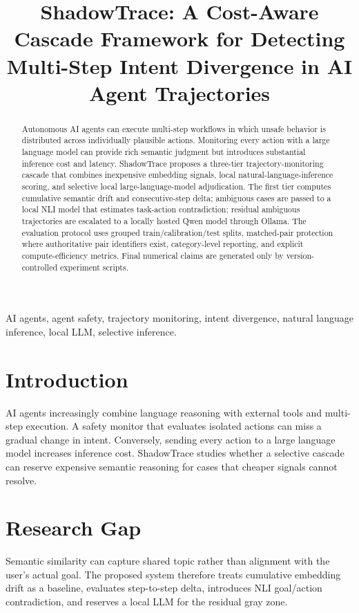 \documentclass[conference]{IEEEtran}
\title{ShadowTrace: A Cost-Aware Cascade Framework for Detecting Multi-Step Intent Divergence in AI Agent Trajectories}
\author{\IEEEauthorblockN{Devesh K. R.}
\IEEEauthorblockA{Division of Data Science and Cyber Security\\
Karunya Institute of Technology and Sciences\\
Coimbatore, India}}
\begin{document}
\maketitle

\begin{abstract}
Autonomous AI agents can execute multi-step workflows in which unsafe behavior is distributed across individually plausible actions. Monitoring every action with a large language model can provide rich semantic judgment but introduces substantial inference cost and latency. ShadowTrace proposes a three-tier trajectory-monitoring cascade that combines inexpensive embedding signals, local natural-language-inference scoring, and selective local large-language-model adjudication. The first tier computes cumulative semantic drift and consecutive-step delta; ambiguous cases are passed to a local NLI model that estimates task-action contradiction; residual ambiguous trajectories are escalated to a locally hosted Qwen model through Ollama. The evaluation protocol uses grouped train/calibration/test splits, matched-pair protection where authoritative pair identifiers exist, category-level reporting, and explicit compute-efficiency metrics. Final numerical claims are generated only by version-controlled experiment scripts.
\end{abstract}

\begin{IEEEkeywords}
AI agents, agent safety, trajectory monitoring, intent divergence, natural language inference, local LLM, selective inference.
\end{IEEEkeywords}

\section{Introduction}
AI agents increasingly combine language reasoning with external tools and multi-step execution. A safety monitor that evaluates isolated actions can miss a gradual change in intent. Conversely, sending every action to a large language model increases inference cost. ShadowTrace studies whether a selective cascade can reserve expensive semantic reasoning for cases that cheaper signals cannot resolve.

\section{Research Gap}
Semantic similarity can capture shared topic rather than alignment with the user's actual goal. The proposed system therefore treats cumulative embedding drift as a baseline, evaluates step-to-step delta, introduces NLI goal/action contradiction, and reserves a local LLM for the residual gray zone.
\end{document}
